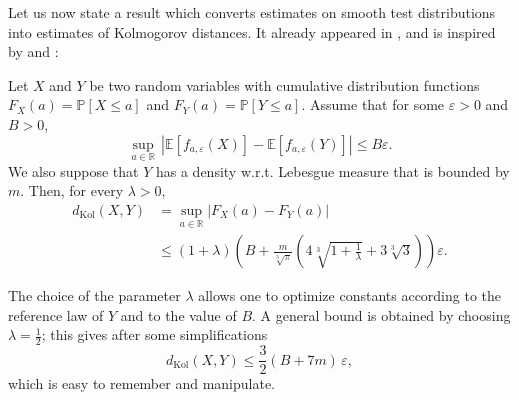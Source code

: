 \documentclass[envcountsame]{svmult}
\newcommand{\R}{\mathbb{R}}
\newcommand{\esper}{\mathbb{E}}
\newcommand{\proba}{\mathbb{P}}
\newcommand{\dkol}{d_\mathrm{Kol}}
\newcommand{\eps}{\varepsilon}
\begin{document}
Let us now state a result which converts estimates on smooth test distributions into estimates of Kolmogorov distances. It already appeared in \cite[Lemma 16]{MN15}, and is inspired by \cite[p.~87]{Tao12} and \cite[Chapter XVI, \S3, Lemma 1]{Fel71}:
\begin{theorem}\label{theorem:tao}
Let $X$ and $Y$ be two random variables with cumulative distribution functions $F_X(a)=\proba[X \leq a]$ and $F_Y(a)=\proba[Y\leq a]$. Assume that for some $\eps>0$ and $B>0$,
$$\sup_{a \in \R} \, |\esper[f_{a,\eps}(X)]-\esper[f_{a,\eps}(Y)] | \leq B\eps.$$
We also suppose that $Y$ has a density w.r.t. Lebesgue measure that is bounded by $m$. Then, for every $\lambda>0$,
\begin{align*}
\dkol(X,Y)&=\sup_{a \in \R} |F_X(a)-F_Y(a)|\\
& \leq (1+\lambda)\left(B+\frac{m}{\sqrt[3]{\pi}}\left(4\sqrt[3]{1+\frac{1}{\lambda}}+3\sqrt[3]{3}\right)\right)\eps.
\end{align*}

\end{theorem}
\noindent The choice of the parameter $\lambda$ allows one to optimize constants according to the reference law of $Y$ and to the value of $B$. A general bound is obtained by choosing $\lambda=\frac{1}{2}$; this gives after some simplifications
	$$\dkol(X,Y) \leq \frac{3}{2}(B+7m)\,\eps,$$
which is easy to remember and manipulate.
\end{document}
